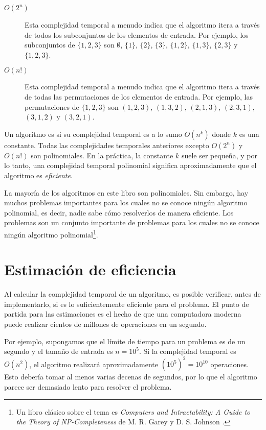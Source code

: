 \begin{description}
\item[$O(2^n)$]
Esta complejidad temporal a menudo indica que
el algoritmo itera a través de todos
los subconjuntos de los elementos de entrada.
Por ejemplo, los subconjuntos de $\{1,2,3\}$ son
$\emptyset$, $\{1\}$, $\{2\}$, $\{3\}$, $\{1,2\}$,
$\{1,3\}$, $\{2,3\}$ y $\{1,2,3\}$.

\item[$O(n!)$]
Esta complejidad temporal a menudo indica que
el algoritmo itera a través de todas
las permutaciones de los elementos de entrada.
Por ejemplo, las permutaciones de $\{1,2,3\}$ son
$(1,2,3)$, $(1,3,2)$, $(2,1,3)$, $(2,3,1)$,
$(3,1,2)$ y $(3,2,1)$.

\end{description}

Un algoritmo es 
si su complejidad temporal es a lo sumo $O(n^k)$
donde $k$ es una constante.
Todas las complejidades temporales anteriores excepto
$O(2^n)$ y $O(n!)$ son polinomiales.
En la práctica, la constante $k$ suele ser pequeña,
y por lo tanto, una complejidad temporal polinomial
significa aproximadamente que el algoritmo es \emph{eficiente}.


La mayoría de los algoritmos en este libro son polinomiales.
Sin embargo, hay muchos problemas importantes para los cuales
no se conoce ningún algoritmo polinomial, es decir,
nadie sabe cómo resolverlos de manera eficiente.
Los problemas  son un conjunto importante
de problemas para los cuales no se conoce ningún algoritmo polinomial\footnote{Un libro clásico sobre el tema es
\emph{Computers and Intractability: A Guide to the Theory
of NP-Completeness} de M. R. Garey y D. S. Johnson \cite{gar79}.}.

\section{Estimación de eficiencia}

Al calcular la complejidad temporal de un algoritmo,
es posible verificar, antes de implementarlo,
si es lo suficientemente eficiente para el problema.
El punto de partida para las estimaciones es el hecho de que
una computadora moderna puede realizar cientos de millones de
operaciones en un segundo.

Por ejemplo, supongamos que el límite de tiempo para
un problema es de un segundo y el tamaño de entrada es $n=10^5$.
Si la complejidad temporal es $O(n^2)$,
el algoritmo realizará aproximadamente $(10^5)^2=10^{10}$ operaciones.
Esto debería tomar al menos varias decenas de segundos,
por lo que el algoritmo parece ser demasiado lento para resolver el problema.

